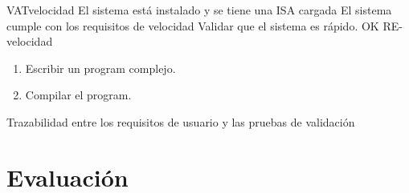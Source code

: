 \begin{testCase}{VAT}{velocidad}
    {El sistema está instalado y se tiene una \gls{ISA} cargada} %
    {El sistema cumple con los requisitos de velocidad} %
    {Validar que el sistema es rápido.} %
    {OK} %
    {RE-velocidad} %
    \begin{enumerate}[leftmargin=*, topsep=0pt, noitemsep] %
        \item Escribir un \gls{program} complejo.
        \item Compilar el \gls{program}.
    \end{enumerate}
\end{testCase}

    {Trazabilidad entre los requisitos de usuario y las pruebas de validación}

\FloatBarrier

\section{Evaluación}\label{sec:evaluation}

\setcounter{eval}{1}

